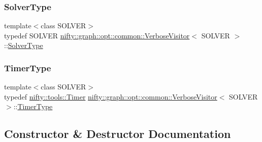 \subsubsection{\texorpdfstring{Solver\+Type}{SolverType}}
{\footnotesize\ttfamily template$<$class S\+O\+L\+V\+ER$>$ \\
typedef S\+O\+L\+V\+ER \hyperlink{classnifty_1_1graph_1_1opt_1_1common_1_1VerboseVisitor}{nifty\+::graph\+::opt\+::common\+::\+Verbose\+Visitor}$<$ S\+O\+L\+V\+ER $>$\+::\hyperlink{classnifty_1_1graph_1_1opt_1_1common_1_1VisitorBase_a433d03139897d4aefe27315b2bbb3adc}{Solver\+Type}}

\mbox{\label{classnifty_1_1graph_1_1opt_1_1common_1_1VerboseVisitor_a32037ceff860ce8e6909b12aa02fa525}} 
\subsubsection{\texorpdfstring{Timer\+Type}{TimerType}}
{\footnotesize\ttfamily template$<$class S\+O\+L\+V\+ER$>$ \\
typedef \hyperlink{classnifty_1_1tools_1_1Timer}{nifty\+::tools\+::\+Timer} \hyperlink{classnifty_1_1graph_1_1opt_1_1common_1_1VerboseVisitor}{nifty\+::graph\+::opt\+::common\+::\+Verbose\+Visitor}$<$ S\+O\+L\+V\+ER $>$\+::\hyperlink{classnifty_1_1graph_1_1opt_1_1common_1_1VerboseVisitor_a32037ceff860ce8e6909b12aa02fa525}{Timer\+Type}}



\subsection{Constructor \& Destructor Documentation}
\mbox{\label{classnifty_1_1graph_1_1opt_1_1common_1_1VerboseVisitor_a1204cafa8df5b0b6fda89262bee6db6c}} 
